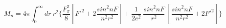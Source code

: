\begin{equation}
M_n= 4\pi \int_0^\infty dr~r^2\{ \frac{F_\pi^2}{8} [ F'^2 +2\frac{sin^2nF}{n^2 r^2} ] +\frac{1}{2e^2} ~\frac{sin^2nF}{r^2}~[\frac{sin^2nF}{n^2 r^2} + 2F'^2]\}   
\end{equation}


